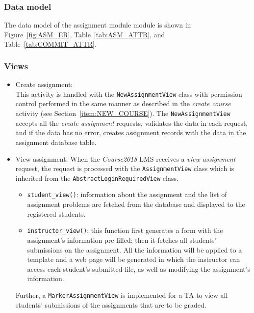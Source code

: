 \subsubsection{Data model}
The data model of the assignment module module is shown in
Figure~\ref{fig:ASM_ER}, Table~\ref{tab:ASM_ATTR},
and Table~\ref{tab:COMMIT_ATTR}. \bigskip


\subsubsection{Views}
\begin{itemize}
    \item Create assignment: \\
        This activity is handled with the \texttt{NewAssignmentView} class with 
        permission control performed in the same manner as described in the
        \emph{create course} activity (see Section~\ref{item:NEW_COURSE}).
        The \texttt{NewAssignmentView} accepts all the \emph{create assignment}
        requests, validates the data in each request, and if the data has no
        error, creates assignment records with the data in the assignment
        database table.

    \item View assignment:
        When the \emph{Course2018} LMS receives a \emph{view assignment}
        request, the request is processed with the \texttt{AssignmentView}
        class which is inherited from the \texttt{AbstractLoginRequiredView}
        class.
        \begin{itemize}
            \item \texttt{student\_view()}:
                information about the assignment and the list of assignment
                problems are fetched from the database and displayed to the 
                registered students.
            \item \texttt{instructor\_view()}:
            \label{item:PROF_VIEW}
                this function first generates a form with the assignment's
                information pre-filled; then it fetches all students'
                submissions on the assignment. All the information will
                be applied to a template and a web page will be generated in
                which the instructor can access each student's submitted file,
                as well as modifying the assignment's information.
        \end{itemize}

        Further, a \texttt{MarkerAssignmentView} is implemented for a TA to
        view all students' submissions of the assignments that are to be
        graded.


\end{itemize}
